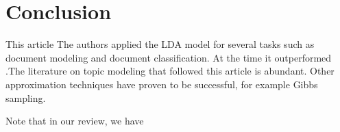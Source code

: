 \documentclass[12pt,a4paper,onecolumn]{article}
\begin{document}
\section{Conclusion}
This article 
The authors applied the LDA model for several tasks such as document modeling and document classification. At the time it outperformed .The literature on topic modeling that followed this article is abundant. Other approximation techniques have proven to be successful, for example Gibbs sampling.

Note that in our review, we have



\printbibliography
\end{document}
